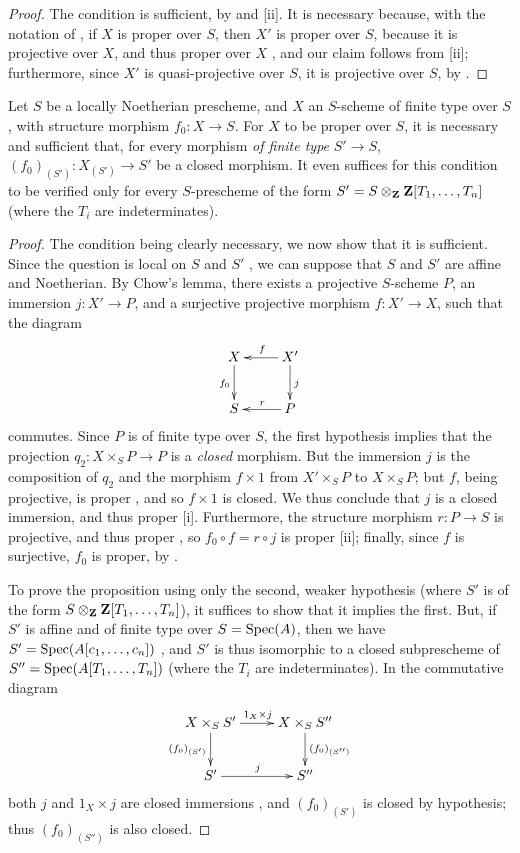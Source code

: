 \begin{proof}
The condition is sufficient, by  and [ii].
It is necessary because, with the notation of , if $X$ is proper over $S$, then $X'$ is proper over $S$, because it is projective over $X$, and thus proper over $X$ , and our claim follows from [ii]; furthermore, since $X'$ is quasi-projective over $S$, it is projective over $S$, by .
\end{proof}

\begin{corollary}[5.6.3]
\label{II.5.6.3}
Let $S$ be a locally Noetherian prescheme, and $X$ an $S$-scheme of finite type over $S$, with structure morphism $f_0:X\to S$.
For $X$ to be proper over $S$, it is necessary and sufficient that, for every morphism \emph{of finite type} $S'\to S$, $(f_0)_{(S')}:X_{(S')}\to S'$ be a closed morphism.
It even suffices for this condition to be verified only for every $S$-prescheme of the form $S'=S\otimes_\mathbf{Z}\mathbf{Z}[T_1,\ldots,T_n]$ (where the $T_i$ are indeterminates).
\end{corollary}

\begin{proof}
The condition being clearly necessary, we now show that it is sufficient.
Since the question is local on $S$ and $S'$ , we can suppose that $S$ and $S'$ are affine and Noetherian.
By Chow's lemma, there exists a projective $S$-scheme $P$, an immersion $j:X'\to P$, and a surjective projective morphism $f:X'\to X$, such that the diagram
\[
  \xymatrix{
    X\ar[d]_{f_0} &
    X'\ar[l]_f\ar[d]^j\\
    S &
    P\ar[l]_r
  }
\]
commutes.
Since $P$ is of finite type over $S$, the first hypothesis implies that the projection $q_2:X\times_S P\to P$ is a \emph{closed} morphism.
But the immersion $j$ is the composition of $q_2$ and the morphism $f\times1$ from $X'\times_S P$ to $X\times_S P$;
but $f$, being projective, is proper , and so $f\times1$ is closed.
We thus conclude that $j$ is a closed immersion, and thus proper [i].
Furthermore, the structure morphism $r:P\to S$ is projective, and thus proper , so $f_0\circ f=r\circ j$ is proper [ii];
finally, since $f$ is surjective, $f_0$ is proper, by .

To prove the proposition using only the second, weaker hypothesis (where $S'$ is of the form $S\otimes_\mathbf{Z}\mathbf{Z}[T_1,\ldots,T_n]$), it suffices to show that it implies the first.
But, if $S'$ is affine and of finite type over $S=\operatorname{Spec}(A)$,
then we have $S'=\operatorname{Spec}(A[c_1,\ldots,c_n])$ , and $S'$ is thus isomorphic to a closed subprescheme of $S''=\operatorname{Spec}(A[T_1,\ldots,T_n])$ (where the $T_i$ are indeterminates).
In the commutative diagram
\[
  \xymatrix{
    X\times_S S'\ar[r]^{1_X\times j}\ar[d]_{(f_0)_{(S')}} &
    X\times_S S''\ar[d]^{(f_0)_{(S'')}}\\
    S'\ar[r]^j &
    S''
  }
\]
both $j$ and $1_X\times j$ are closed immersions , and $(f_0)_{(S')}$ is closed by hypothesis; thus $(f_0)_{(S'')}$ is also closed.
\end{proof}


